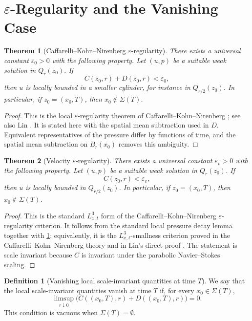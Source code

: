\documentclass[11pt]{amsart}
\theoremstyle{plain}
\newtheorem{theorem}{Theorem}[section]
\theoremstyle{definition}
\newtheorem{definition}[definition]{Definition}
\theoremstyle{remark}
\numberwithin{equation}{section}
\begin{document}
\section{\texorpdfstring{\(\varepsilon\)-Regularity}{Epsilon-Regularity} and the Vanishing Case}

\begin{theorem}[Caffarelli--Kohn--Nirenberg \(\varepsilon\)-regularity]
\label{p0:thm:ckn}
There exists a universal constant \(\varepsilon_0>0\) with the
following property.  Let \((u,p)\) be a suitable weak solution in \(Q_r(z_0)\).
If
\[
  C(z_0,r)+D(z_0,r)<\varepsilon_0,
\]
then \(u\) is locally bounded in a smaller cylinder, for instance in
\(Q_{r/2}(z_0)\).  In particular, if \(z_0=(x_0,T)\), then
\(x_0\notin\Sigma(T)\).
\end{theorem}

\begin{proof}
This is the local \(\varepsilon\)-regularity theorem of
Caffarelli--Kohn--Nirenberg \cite{CKN1982}; see also Lin \cite{Lin1998}.  It is
stated here with the spatial mean subtraction used in \(D\).  Equivalent
representatives of the pressure differ by functions of time, and the spatial
mean subtraction on \(B_r(x_0)\) removes this ambiguity.
\end{proof}

\begin{theorem}[Velocity \(\varepsilon\)-regularity]\label{p0:thm:velocity-ckn}
There exists a universal constant \(\varepsilon_v>0\) with the following
property.  Let \((u,p)\) be a suitable weak solution in \(Q_r(z_0)\).  If
\[
  C(z_0,r)<\varepsilon_v,
\]
then \(u\) is locally bounded in \(Q_{r/2}(z_0)\).  In particular, if
\(z_0=(x_0,T)\), then \(x_0\notin\Sigma(T)\).
\end{theorem}

\begin{proof}
This is the standard \(L^3_{x,t}\) form of the Caffarelli--Kohn--Nirenberg
\(\varepsilon\)-regularity criterion.  It follows from the standard local
pressure decay lemma together with \cref{p0:thm:ckn}; equivalently, it is the
\(L^3_{x,t}\)-smallness criterion
proved in the Caffarelli--Kohn--Nirenberg theory and in Lin's direct proof
\cite{CKN1982,Lin1998}.  The statement is scale invariant because \(C\) is
invariant under the parabolic Navier--Stokes scaling.
\end{proof}

\begin{definition}[Vanishing local scale-invariant quantities at time \(T\)]
We say that the local scale-invariant quantities vanish at time \(T\) if, for
every \(x_0\in\Sigma(T)\),
\[
  \limsup_{r\downarrow0}
  \bigl(C((x_0,T),r)+D((x_0,T),r)\bigr)=0.
\]
This condition is vacuous when \(\Sigma(T)=\emptyset\).
\end{definition}
\end{document}
